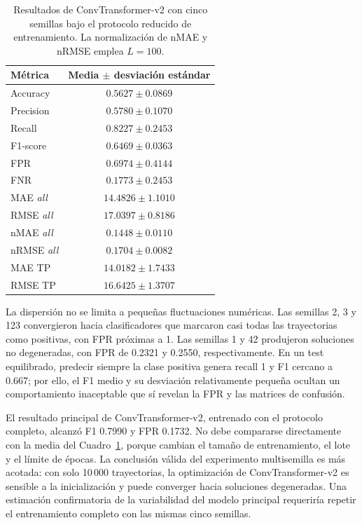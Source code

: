 \documentclass[a4paper,12pt]{article}
\begin{document}
\begin{table}[htbp]
\centering
\small
\begin{tabular}{lc}
\toprule
\textbf{Métrica} & \textbf{Media $\boldsymbol{\pm}$ desviación estándar} \\
\midrule
Accuracy & $0.5627 \pm 0.0869$ \\
Precision & $0.5780 \pm 0.1070$ \\
Recall & $0.8227 \pm 0.2453$ \\
F1-score & $0.6469 \pm 0.0363$ \\
FPR & $0.6974 \pm 0.4144$ \\
FNR & $0.1773 \pm 0.2453$ \\
MAE \emph{all} & $14.4826 \pm 1.1010$ \\
RMSE \emph{all} & $17.0397 \pm 0.8186$ \\
nMAE \emph{all} & $0.1448 \pm 0.0110$ \\
nRMSE \emph{all} & $0.1704 \pm 0.0082$ \\
MAE TP & $14.0182 \pm 1.7433$ \\
RMSE TP & $16.6425 \pm 1.3707$ \\
\bottomrule
\end{tabular}
\caption{Resultados de ConvTransformer-v2 con cinco semillas bajo el protocolo reducido de entrenamiento. La normalización de nMAE y nRMSE emplea $L=100$.}
\label{tab:convtransformer-multiseed}
\end{table}

La dispersión no se limita a pequeñas fluctuaciones numéricas. Las semillas 2, 3 y 123 convergieron hacia clasificadores que marcaron casi todas las trayectorias como positivas, con FPR próximas a 1. Las semillas 1 y 42 produjeron soluciones no degeneradas, con FPR de 0.2321 y 0.2550, respectivamente. En un test equilibrado, predecir siempre la clase positiva genera recall 1 y F1 cercano a 0.667; por ello, el F1 medio y su desviación relativamente pequeña ocultan un comportamiento inaceptable que sí revelan la FPR y las matrices de confusión.

El resultado principal de ConvTransformer-v2, entrenado con el protocolo completo, alcanzó F1 0.7990 y FPR 0.1732. No debe compararse directamente con la media del Cuadro~\ref{tab:convtransformer-multiseed}, porque cambian el tamaño de entrenamiento, el lote y el límite de épocas. La conclusión válida del experimento multisemilla es más acotada: con solo 10\,000 trayectorias, la optimización de ConvTransformer-v2 es sensible a la inicialización y puede converger hacia soluciones degeneradas. Una estimación confirmatoria de la variabilidad del modelo principal requeriría repetir el entrenamiento completo con las mismas cinco semillas.
\end{document}
